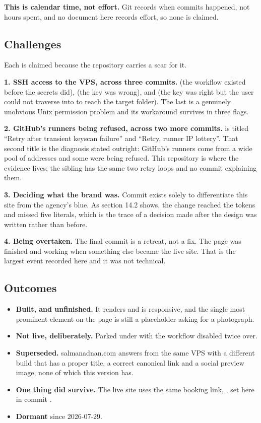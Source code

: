 \documentclass[11pt,a4paper]{article}
\begin{document}
\textbf{This is calendar time, not effort.} Git records when commits happened, not
hours spent, and no document here records effort, so none is claimed.

\subsection{Challenges}

Each is claimed because the repository carries a scar for it.

\textbf{1. SSH access to the VPS, across three commits.}  (the
workflow existed before the secrets did),  (the key was wrong), and
 (the key was right but the  user could not traverse
into  to reach the target folder). The last is a genuinely unobvious
Unix permission problem and its workaround survives in three  flags.

\textbf{2. GitHub's runners being refused, across two more commits.}
 is titled ``Retry after transient keyscan failure'' and
 ``Retry, runner IP lottery''. That second title is the diagnosis
stated outright: GitHub's runners come from a wide pool of addresses and some were
being refused. This repository is where the evidence lives; the sibling has the
same two retry loops and no commit explaining them.

\textbf{3. Deciding what the brand was.} Commit  exists solely to
differentiate this site from the agency's blue. As section 14.2 shows, the change
reached the tokens and missed five literals, which is the trace of a decision made
after the design was written rather than before.

\textbf{4. Being overtaken.} The final commit is a retreat, not a fix. The page was
finished and working when something else became the live site. That is the largest
event recorded here and it was not technical.

\subsection{Outcomes}

\begin{itemize}
\item \textbf{Built, and unfinished.} It renders and is responsive, and the single
  most prominent element on the page is still a placeholder asking for a
  photograph.
\item \textbf{Not live, deliberately.} Parked under 
  with the workflow disabled twice over.
\item \textbf{Superseded.} salmanadnan.com answers from the same VPS with a
  different build that has a proper title, a correct canonical link and a social
  preview image, none of which this version has.
\item \textbf{One thing did survive.} The live site uses the same booking link,
  , set here in commit .
\item \textbf{Dormant} since 2026-07-29.
\end{itemize}
\end{document}
